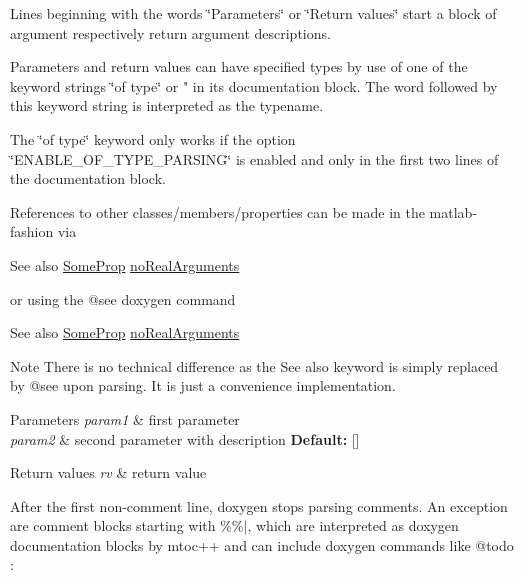 Lines beginning with the words \char`\"{}\+Parameters\char`\"{} or \char`\"{}\+Return values\char`\"{} start a block of argument respectively return argument descriptions.

Parameters and return values can have specified types by use of one of the keyword strings \char`\"{}of type\char`\"{} or " in its documentation block. The word followed by this keyword string is interpreted as the typename.

The \char`\"{}of type\char`\"{} keyword only works if the option \char`\"{}\+E\+N\+A\+B\+L\+E\+\_\+\+O\+F\+\_\+\+T\+Y\+P\+E\+\_\+\+P\+A\+R\+S\+I\+N\+G\char`\"{} is enabled and only in the first two lines of the documentation block.

References to other classes/members/properties can be made in the matlab-\/fashion via \begin{DoxySeeAlso}{See also}
\hyperlink{classexamples_1_1_class_ae3f0807afb99d8b3bc482712607653c7}{Some\+Prop} \hyperlink{classexamples_1_1_class_aebd897ed5a726cf0f09c5f40a9702484}{no\+Real\+Arguments}
\end{DoxySeeAlso}
or using the {\ttfamily  @see } doxygen command \begin{DoxySeeAlso}{See also}
\hyperlink{classexamples_1_1_class_ae3f0807afb99d8b3bc482712607653c7}{Some\+Prop} \hyperlink{classexamples_1_1_class_aebd897ed5a726cf0f09c5f40a9702484}{no\+Real\+Arguments}
\end{DoxySeeAlso}
\begin{DoxyNote}{Note}
There is no technical difference as the {\ttfamily See also} keyword is simply replaced by @see upon parsing. It is just a convenience implementation.
\end{DoxyNote}

\begin{DoxyParams}{Parameters}
{\em param1} & first parameter \\
\hline
{\em param2} & second parameter with description {\bfseries Default\+:} \mbox{[}\mbox{]}\\
\hline
\end{DoxyParams}

\begin{DoxyRetVals}{Return values}
{\em rv} & return value \\
\hline
\end{DoxyRetVals}
After the first non-\/comment line, doxygen stops parsing comments. An exception are comment blocks starting with \textquotesingle{}\%\%$\vert$\textquotesingle{}, which are interpreted as doxygen documentation blocks by mtoc++ and can include doxygen commands like @todo \+:

